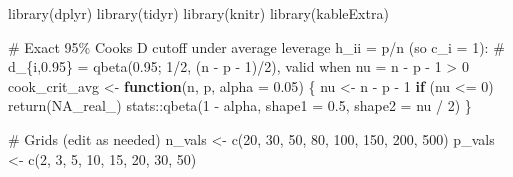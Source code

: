 \documentclass[
  letterpaper,
  DIV=11,
  numbers=noendperiod]{scrreprt}
\newenvironment{Shaded}{\begin{snugshade}}{\end{snugshade}}
\newcommand{\AttributeTok}[1]{\textcolor[rgb]{0.40,0.45,0.13}{#1}}
\newcommand{\CommentTok}[1]{\textcolor[rgb]{0.37,0.37,0.37}{#1}}
\newcommand{\ConstantTok}[1]{\textcolor[rgb]{0.56,0.35,0.01}{#1}}
\newcommand{\ControlFlowTok}[1]{\textcolor[rgb]{0.00,0.23,0.31}{\textbf{#1}}}
\newcommand{\DecValTok}[1]{\textcolor[rgb]{0.68,0.00,0.00}{#1}}
\newcommand{\FloatTok}[1]{\textcolor[rgb]{0.68,0.00,0.00}{#1}}
\newcommand{\FunctionTok}[1]{\textcolor[rgb]{0.28,0.35,0.67}{#1}}
\newcommand{\NormalTok}[1]{\textcolor[rgb]{0.00,0.23,0.31}{#1}}
\newcommand{\OtherTok}[1]{\textcolor[rgb]{0.00,0.23,0.31}{#1}}
\newcommand{\SpecialCharTok}[1]{\textcolor[rgb]{0.37,0.37,0.37}{#1}}
\begin{document}
\begin{Shaded}
\begin{Highlighting}[]
\FunctionTok{library}\NormalTok{(dplyr)}
\FunctionTok{library}\NormalTok{(tidyr)}
\FunctionTok{library}\NormalTok{(knitr)}
\FunctionTok{library}\NormalTok{(kableExtra)}

\CommentTok{\# Exact 95\% Cook\textquotesingle{}s D cutoff under average leverage h\_ii = p/n (so c\_i = 1):}
\CommentTok{\# d\_\{i,0.95\} = qbeta(0.95; 1/2, (n {-} p {-} 1)/2), valid when nu = n {-} p {-} 1 \textgreater{} 0}
\NormalTok{cook\_crit\_avg }\OtherTok{\textless{}{-}} \ControlFlowTok{function}\NormalTok{(n, p, }\AttributeTok{alpha =} \FloatTok{0.05}\NormalTok{) \{}
\NormalTok{  nu }\OtherTok{\textless{}{-}}\NormalTok{ n }\SpecialCharTok{{-}}\NormalTok{ p }\SpecialCharTok{{-}} \DecValTok{1}
  \ControlFlowTok{if}\NormalTok{ (nu }\SpecialCharTok{\textless{}=} \DecValTok{0}\NormalTok{) }\FunctionTok{return}\NormalTok{(}\ConstantTok{NA\_real\_}\NormalTok{)}
\NormalTok{  stats}\SpecialCharTok{::}\FunctionTok{qbeta}\NormalTok{(}\DecValTok{1} \SpecialCharTok{{-}}\NormalTok{ alpha, }\AttributeTok{shape1 =} \FloatTok{0.5}\NormalTok{, }\AttributeTok{shape2 =}\NormalTok{ nu }\SpecialCharTok{/} \DecValTok{2}\NormalTok{)}
\NormalTok{\}}

\CommentTok{\# Grids (edit as needed)}
\NormalTok{n\_vals }\OtherTok{\textless{}{-}} \FunctionTok{c}\NormalTok{(}\DecValTok{20}\NormalTok{, }\DecValTok{30}\NormalTok{, }\DecValTok{50}\NormalTok{, }\DecValTok{80}\NormalTok{, }\DecValTok{100}\NormalTok{, }\DecValTok{150}\NormalTok{, }\DecValTok{200}\NormalTok{, }\DecValTok{500}\NormalTok{)}
\NormalTok{p\_vals }\OtherTok{\textless{}{-}} \FunctionTok{c}\NormalTok{(}\DecValTok{2}\NormalTok{, }\DecValTok{3}\NormalTok{, }\DecValTok{5}\NormalTok{, }\DecValTok{10}\NormalTok{, }\DecValTok{15}\NormalTok{, }\DecValTok{20}\NormalTok{, }\DecValTok{30}\NormalTok{, }\DecValTok{50}\NormalTok{)}


\end{Highlighting}
\end{Shaded}
\end{document}
